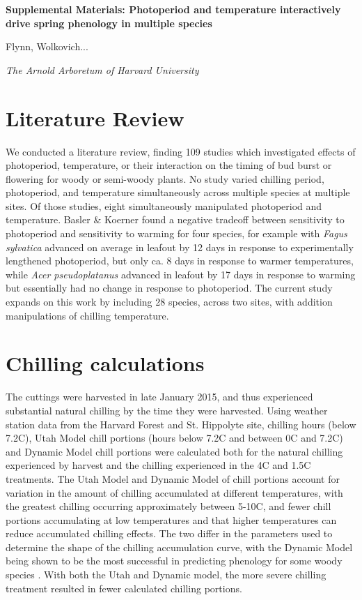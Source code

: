 \documentclass{article}
\begin{document}

\flushleft

\textbf{\large{Supplemental Materials: Photoperiod and temperature interactively drive spring phenology in multiple species}}

Flynn, Wolkovich...

\textit{The Arnold Arboretum of Harvard University}

\renewcommand{\thetable}{S\arabic{table}}
\renewcommand{\thefigure}{S\arabic{figure}}

\section*{Literature Review}

We conducted a literature review, finding 109 studies which investigated effects of photoperiod, temperature, or their interaction on the timing of bud burst or flowering for woody or semi-woody plants.  No study varied chilling period, photoperiod, and temperature simultaneously across multiple species at multiple sites. Of those studies, eight simultaneously manipulated photoperiod and temperature. Basler \& Koerner \cite{Basler:2014aa} found a negative tradeoff between sensitivity to photoperiod and sensitivity to warming for four species, for example with \emph{Fagus sylvatica} advanced on average in leafout by 12 days in response to experimentally lengthened photoperiod, but only ca. 8 days in response to warmer temperatures, while \emph{Acer pseudoplatanus} advanced in leafout by 17 days in response to warming but essentially had no change in response to photoperiod. The current study expands on this work by including 28 species, across two sites, with addition manipulations of chilling temperature.

\section*{Chilling calculations}
The cuttings were harvested in late January 2015, and thus experienced substantial natural chilling by the time they were harvested. Using weather station data from the Harvard Forest and St. Hippolyte site, chilling hours (below 7.2\degree C), Utah Model chill portions (hours below 7.2\degree C and between 0\degree C and 7.2\degree C) and Dynamic Model \cite{Erez:1988} chill portions were calculated both for the natural chilling experienced by harvest and the chilling experienced in the 4\degree C and 1.5\degree C treatments. The Utah Model and Dynamic Model of chill portions account for variation in the amount of chilling accumulated at different temperatures, with the greatest chilling occurring approximately between 5-10\degree C, and fewer chill portions accumulating at low temperatures and that higher temperatures can reduce accumulated chilling effects. The two differ in the parameters used to determine the shape of the chilling accumulation curve, with the Dynamic Model being shown to be the most successful in predicting phenology for some woody species \cite{Luedeling:2009}.
With both the Utah and Dynamic model, the more severe chilling treatment resulted in fewer calculated chilling portions. 
\end{document}
